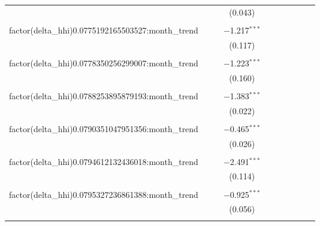 \begin{table}[H]
{\begin{tabular}{@{\extracolsep{5pt}}lccccccccc}
   &  &  & (0.043) &  &  &  &  &  &  \\  

   & & & & & & & & & \\  

  factor(delta\_hhi)0.0775192165503527:month\_trend &  &  & $-$1.217$^{***}$ &  &  &  &  &  &  \\  

   &  &  & (0.117) &  &  &  &  &  &  \\  

   & & & & & & & & & \\  

  factor(delta\_hhi)0.0778350256299007:month\_trend &  &  & $-$1.223$^{***}$ &  &  &  &  &  &  \\  

   &  &  & (0.160) &  &  &  &  &  &  \\  

   & & & & & & & & & \\  

  factor(delta\_hhi)0.0788253895879193:month\_trend &  &  & $-$1.383$^{***}$ &  &  &  &  &  &  \\  

   &  &  & (0.022) &  &  &  &  &  &  \\  

   & & & & & & & & & \\  

  factor(delta\_hhi)0.0790351047951356:month\_trend &  &  & $-$0.465$^{***}$ &  &  &  &  &  &  \\  

   &  &  & (0.026) &  &  &  &  &  &  \\  

   & & & & & & & & & \\  

  factor(delta\_hhi)0.0794612132436018:month\_trend &  &  & $-$2.491$^{***}$ &  &  &  &  &  &  \\  

   &  &  & (0.114) &  &  &  &  &  &  \\  

   & & & & & & & & & \\  

  factor(delta\_hhi)0.0795327236861388:month\_trend &  &  & $-$0.925$^{***}$ &  &  &  &  &  &  \\  

   &  &  & (0.056) &  &  &  &  &  &  \\  

   & & & & & & & & & \\  


\end{tabular}}
\end{table}
